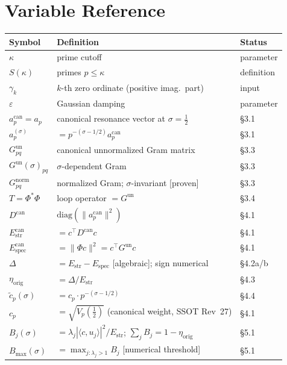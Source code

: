 \documentclass[11pt]{article}
\newcommand{\Estr}{E_{\mathrm{str}}}
\newcommand{\Espec}{E_{\mathrm{spec}}}
\newcommand{\etaorig}{\eta_{\mathrm{orig}}}
\newcommand{\Gun}{G^{\mathrm{un}}}
\newcommand{\Gnorm}{G^{\mathrm{norm}}}
\newcommand{\acan}{a_p^{\mathrm{can}}}
\newcommand{\Dcan}{D^{\mathrm{can}}}
\newcommand{\Estrcan}{\Estr^{\mathrm{can}}}
\newcommand{\Especcan}{\Espec^{\mathrm{can}}}
\begin{document}
\appendix

\section{Variable Reference}

\begin{center}
\renewcommand{\arraystretch}{1.25}
\begin{tabular}{p{3.4cm}p{7.0cm}p{2.0cm}}
\toprule
Symbol & Definition & Status \\
\midrule
$\kappa$ & prime cutoff & parameter \\
$S(\kappa)$ & primes $p\leq\kappa$ & definition \\
$\gamma_k$ & $k$-th zero ordinate (positive imag.\ part) & input \\
$\varepsilon$ & Gaussian damping & parameter \\
$\acan=a_p$ & canonical resonance vector at $\sigma=\tfrac12$ & \S3.1 \\
$a_p^{(\sigma)}$ & $=p^{-(\sigma-1/2)}\acan$ & \S3.1 \\
$\Gun_{pq}$ & canonical unnormalized Gram matrix & \S3.3 \\
$\Gun(\sigma)_{pq}$ & $\sigma$-dependent Gram & \S3.3 \\
$\Gnorm_{pq}$ & normalized Gram; $\sigma$-invariant [proven] & \S3.3 \\
$T=\Phi^*\Phi$ & loop operator $=\Gun$ & \S3.4 \\
$\Dcan$ & $\mathrm{diag}(\|\acan\|^2)$ & \S4.1 \\
$\Estrcan$ & $=c^\top\Dcan c$ & \S4.1 \\
$\Especcan$ & $=\|\Phi c\|^2=c^\top\Gun c$ & \S4.1 \\
$\Delta$ & $=\Estr-\Espec$ [algebraic]; sign numerical & \S4.2a/b \\
$\etaorig$ & $=\Delta/\Estr$ & \S4.3 \\
$\tilde{c}_p(\sigma)$ & $=c_p\cdot p^{-(\sigma-1/2)}$ & \S4.4 \\
$c_p$ & $=\sqrt{V_p({\textstyle\frac12})}$ (canonical weight, SSOT Rev~27) & \S4.1 \\ %
$B_j(\sigma)$ & $=\lambda_j|\langle c,u_j\rangle|^2/\Estr$; $\sum_jB_j=1-\etaorig$ & \S5.1 \\
$B_{\max}(\sigma)$ & $=\max_{j:\lambda_j>1}B_j$ [numerical threshold] & \S5.1 \\
\bottomrule
\end{tabular}
\end{center}
\end{document}
